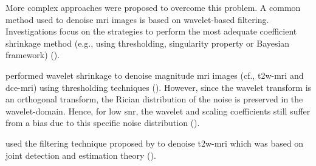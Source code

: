 \begin{enumerate}[leftmargin=*]
More complex approaches were proposed to overcome this problem. A common method used to denoise \ac{mri} images is based on wavelet-based filtering. %
Investigations focus on the strategies to perform the most adequate coefficient shrinkage method (e.g., using thresholding, singularity property or Bayesian framework) (\cite{Pizurica2002}).

\cite{Ampeliotis2007,Ampeliotis2008} performed wavelet shrinkage to denoise magnitude \ac{mri} images (cf., \ac{t2w}-\ac{mri} and \ac{dce}-\ac{mri}) using thresholding techniques (\cite{Mallat2008}). However, since the wavelet transform is an orthogonal transform, the Rician distribution of the noise is preserved in the wavelet-domain. Hence, for low \ac{snr}, the wavelet and scaling coefficients still suffer from a bias due to this specific noise distribution (\cite{Nowak1999}). 

\cite{Lopes2011} used the filtering technique proposed by \cite{Pizurica2003} to denoise \ac{t2w}-\ac{mri} which was based on joint detection and estimation theory (\cite{Middleton1968}).%


\end{enumerate}
